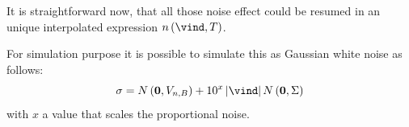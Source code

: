 It is straightforward now, that all those noise effect could be resumed in an unique interpolated expression $n \braces{\vind,T}$.

For simulation purpose it is possible to simulate this as Gaussian white noise as follows:
\begin{equation}
\sigma = N\braces{\mathbf{0}, V_{n,B}} + 10^{x} \abs{\vind} N\braces{\mathbf{0}, \Sigma}
\end{equation}
with $x$ a value that scales the proportional noise.